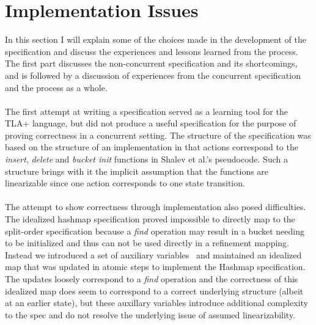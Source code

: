 \documentclass{uit-thesis}
\begin{document}
\section{Implementation Issues}
In this section I will explain some of the choices made in the development of the specification and discuss the experiences and lessons learned from the process. The first part discusses the non-concurrent specification and its shortcomings, and is followed by a discussion of experiences from the concurrent specification and the process as a whole. 
\\\\
The first attempt at writing a specification served as a learning tool for the TLA+ language, but did not produce a useful specification for the purpose of proving correctness in a concurrent setting. The structure of the specification was based on the structure of an implementation in that actions correspond to the \textit{insert}, \textit{delete} and \textit{bucket init} functions in Shalev et al.'s pseudocode. Such a structure brings with it the implicit assumption that the functions are linearizable since one action corresponds to one state transition.
\\\\
The attempt to show correctness through implementation also posed difficulties. The idealized hashmap specification proved impossible to directly map to the split-order specification because a \textit{find} operation may result in a bucket needing to be initialized and thus can not be used directly in a refinement mapping. Instead we introduced a set of auxiliary variables~\cite{Lamport2019a} and maintained an idealized map that was updated in atomic steps to implement the Hashmap specification. The updates loosely correspond to a \textit{find} operation and the correctness of this idealized map does seem to correspond to a correct underlying structure (albeit at an earlier state), but these auxillary variables introduce additional complexity to the spec and do not resolve the underlying issue of assumed linearizability.
\\\\
\end{document}
